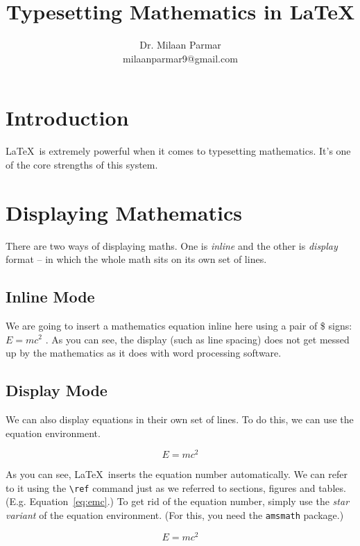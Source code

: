 \documentclass{article}
\begin{document}
\title{Typesetting Mathematics in \LaTeX}
\author{Dr. Milaan Parmar \\ milaanparmar9@gmail.com}
\maketitle


\section{Introduction} 
\LaTeX\ is extremely powerful when it comes to typesetting mathematics. It's one of the core strengths of this system. 

\section{Displaying Mathematics}
There are two ways of displaying maths. One is \emph{inline} and the other is \emph{display} format -- in which the whole math sits on its own set of lines.


\subsection{Inline Mode}
We are going to insert a mathematics equation inline here using a pair of \$ signs:  $E=mc^2$    . As you can see, the display (such as line spacing) does not get messed up by the mathematics as it does with word processing software. 

\subsection{Display Mode}
We can also display equations in their own set of lines. To do this, we can use the equation environment. 

\begin{equation}\label{eq:emc}
E=mc^2
\end{equation}

As you can see, \LaTeX\ inserts the equation number automatically. We can refer to it using the \verb|\ref| command just as we referred to sections, figures and tables. (E.g. Equation~\ref{eq:emc}.) To get rid of the equation number, simply use the \emph{star variant} of the equation environment. (For this, you need the \texttt{amsmath} package.)

\begin{equation*}
E=mc^2
\end{equation*}
\end{document}

